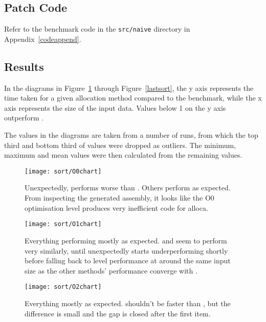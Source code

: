 \subsection{Patch Code}

Refer to the benchmark code in the \texttt{src/naive} directory in Appendix~\ref{codeappend}.

\subsection{Results}

In the diagrams in Figure~\ref{firstsort} through Figure~\ref{lastsort}, the y axis represents the time taken for a given allocation method compared to the  benchmark, while the x axis represents the size of the input data. Values below 1 on the y axis outperform \malloc{}.

The values in the diagrams are taken from a number of runs, from which the top third and bottom third of values were dropped as outliers. The minimum, maximum and mean values were then calculated from the remaining values.

\begin{figure}[ph]
	\centering
	\texttt{[image: sort/O0chart]}
	\caption{Unexpectedly,  performs worse than . Others perform as expected. From inspecting the generated assembly, it looks like the O0 optimisation level produces very inefficient code for alloca.}\label{firstsort}
\end{figure}

\begin{figure}[ph]
	\centering
	\texttt{[image: sort/O1chart]}
	\caption{Everything performing mostly as expected.  and  seem to perform very similarly, until  unexpectedly starts underperforming  shortly before falling back to  level performance at around the same input size as the other methods' performance converge with .}
\end{figure}

\begin{figure}[ph]
	\centering
	\texttt{[image: sort/O2chart]}
	\caption{Everything mostly as expected.  shouldn't be faster than , but the difference is small and the gap is closed after the first item.}
\end{figure}

